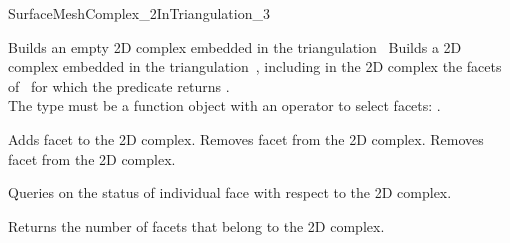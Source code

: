 \begin{ccRefConcept}{SurfaceMeshComplex_2InTriangulation_3}
\ccCreation
{}  %

{}
 {Builds an empty 2D complex embedded in the triangulation~}
\ccGlue
{}
{Builds a 2D complex embedded in the triangulation~,
including in the 2D complex the facets of~ for 
 which the predicate  returns .\\
The type  must be
a function object with an operator to select facets:
.}


\ccGlue
{}
{Adds facet  to the 2D complex.}
\ccGlue
{}
{Removes facet  from  the 2D complex.}
\ccGlue
{}
{Removes facet  from the 2D complex.}

Queries on the status  of individual face with respect to the 2D complex.

{Returns the number of facets that belong to the 2D complex.}


\end{ccRefConcept}
